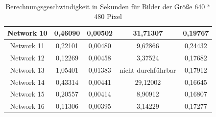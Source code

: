 \begin{table}[H]
\begin{tabular}{ |c|c|c|c|c| }
        Network 10 & 0,46090                                & 0,00502                                & 31,71307                               & 0,19767                                \\ \hline
        Network 11 & 0,22101                                & 0,00480                                & 9,62866                                & 0,24432                                \\ \hline
        Network 12 & 0,12269                                & 0,00458                                & 3,37524                                & 0,17682                                \\ \hline
        Network 13 & 1,05401                                & 0,01383                                & \textcolor{danger}{nicht durchführbar} & 0,17912                                \\ \hline
        Network 14 & 0,43314                                & 0,00441                                & 29,12002                               & 0,16645                                \\ \hline
        Network 15 & 0,20557                                & 0,00414                                & 8,90912                                & 0,16807                                \\ \hline
        Network 16 & 0,11306                                & 0,00395                                & 3,14229                                & 0,17277                                \\ \hline
    \end{tabular}
    \caption{Berechnungsgeschwindigkeit in Sekunden für Bilder der Größe 640 * 480 Pixel}
    \label{tab:640x480}
\end{table}


